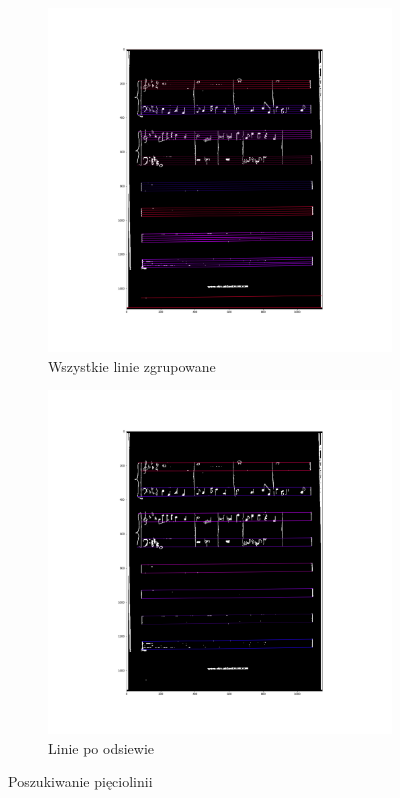 \documentclass[12pt]{article}
\begin{document}
	\begin{figure}[h!]
		\centering
		\begin{subfigure}[b]{0.48\linewidth}
			\includegraphics[width=\linewidth]{zdj/5l0.png}
			\caption{Wszystkie linie zgrupowane}
		\end{subfigure}
		\begin{subfigure}[b]{0.48\linewidth}
			\includegraphics[width=\linewidth]{zdj/5l1.png}
			\caption{Linie po odsiewie}
		\end{subfigure}
		\caption{Poszukiwanie pięciolinii}
		\label{fig:5l}
	\end{figure}
	
\end{document}
